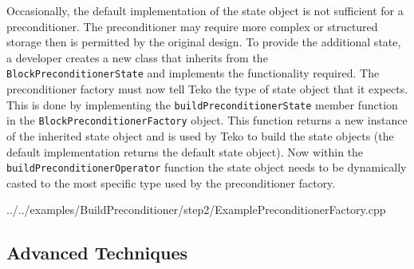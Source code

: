 \documentclass[12pt]{article}
\newcommand{\code}[1]{\lstinline[basicstyle=\footnotesize]!#1!}
\begin{document}
Occasionally, the default implementation of the state object is not sufficient for a preconditioner.
The preconditioner may require more complex or structured storage then is permitted by the original design.
To provide the additional state, a developer creates a new class that inherits from the
\code{BlockPreconditionerState} and implements the functionality required.  The preconditioner factory must
now tell Teko the type of state object that it expects. This is done by implementing the
\code{buildPreconditionerState} member function in the \code{BlockPreconditionerFactory} object. This function
returns a new instance of the inherited state object and is used by Teko to build the state objects (the default
implementation returns the default state object). Now within the \code{buildPreconditionerOperator} function
the state object needs to be dynamically casted to the most specific type used by the preconditioner factory.

\begin{framed}

   {../../examples/BuildPreconditioner/step2/ExamplePreconditionerFactory.cpp}
\end{framed}


\subsection{Advanced Techniques}
\end{document}

